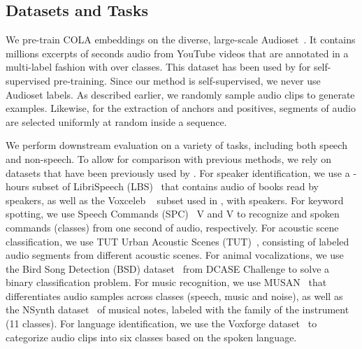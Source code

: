 \documentclass{article}
\newcommand{\ours}{COLA }
\begin{document}
\subsection{Datasets and Tasks}
We pre-train \ours embeddings on the diverse, large-scale Audioset~\cite{gemmeke2017audio}. It contains  millions excerpts of  seconds audio from YouTube videos that are annotated in a multi-label fashion with over  classes. This dataset has been used by \cite{tagliasacchi2019self, tagliasacchi2020pre,shor2020towards} for self-supervised pre-training. Since our method is self-supervised, we never use Audioset labels. As described earlier, we randomly sample audio clips to generate examples. Likewise, for the extraction of anchors and positives, segments of audio are selected uniformly at random inside a sequence.

We perform downstream evaluation on a variety of tasks, including both speech and non-speech. To allow for comparison with previous methods, we rely on datasets that have been previously used by \cite{tagliasacchi2019self, tagliasacchi2020pre, shor2020towards}. For speaker identification, we use a -hours subset of LibriSpeech (LBS)~\cite{panayotov2015librispeech} that contains audio of books read by  speakers, as well as the Voxceleb ~\cite{nagrani2017voxceleb} subset used in \cite{shor2020towards}, with  speakers. For keyword spotting, we use Speech Commands (SPC)~\cite{warden2018speech} V and V to recognize  and  spoken commands (classes) from one second of audio, respectively. For acoustic scene classification, we use TUT Urban Acoustic Scenes  (TUT)~\cite{heittola_2018}, consisting of labeled audio segments from  different acoustic scenes. For animal vocalizations, we use the Bird Song Detection (BSD) dataset~\cite{stowell2019automatic} from DCASE  Challenge to solve a binary classification problem. For music recognition, we use MUSAN~\cite{snyder2015musan} that differentiates audio samples across  classes (speech, music and noise), as well as the NSynth dataset~\cite{engel2017neural} of musical notes, labeled with the family of the instrument (11 classes). For language identification, we use the Voxforge dataset~\cite{maclean2018voxforge} to categorize audio clips into six classes based on the spoken language.
\end{document}
